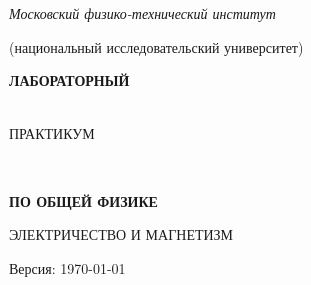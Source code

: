 \setcounter{page}{1}
\thispagestyle{empty}\mbox{}

\noindent
{}%
\hfill
\parbox{90mm}{\centering\itshape Московский физико-технический институт\par
(национальный исследовательский университет)\par}%
\hfill

\vfill

{\parindent=0pt\centering
{\noindent\bfseries\Huge ЛАБОРАТОРНЫЙ\strut\\ ПРАКТИКУМ\strut\\
}
{\bfseries\LARGE ПО ОБЩЕЙ ФИЗИКЕ }

\vfill



{\bfseries\large\strut ЭЛЕКТРИЧЕСТВО И МАГНЕТИЗМ\strut}

}

\newlength{\vva}
\setlength{\vva}{0.3\textwidth}
\newlength{\vvb} 
\setlength{\vvb}{0.46\textwidth}

\vfill


{\hfil Версия: \today}


\vfill

\newpage
